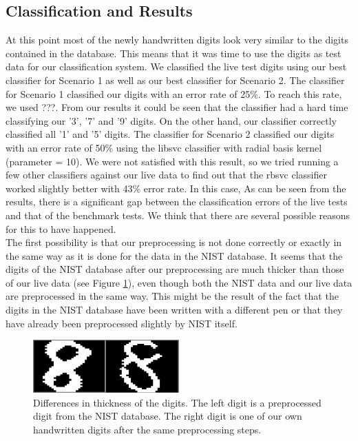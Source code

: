 \documentclass[11pt,twoside,a4paper]{article}
\begin{document}
\subsection{Classification and Results}
At this point most of the newly handwritten digits look very similar to the digits contained in the database. This means that it was time to use the digits as test data for our classification system. We classified the live test digits using our best classifier for Scenario 1 as well as our best classifier for Scenario 2. 
\newline
\newline
The classifier for Scenario 1 classified our digits with an error rate of 25\%. To reach this rate, we used ???. From our results it could be seen that the classifier had a hard time classifying our '3', '7' and '9' digits. On the other hand, our classifier correctly classified all '1' and '5' digits.\newline
\newline
The classifier for Scenario 2 classified our digits with an error rate of 50\% using the libsvc classifier with radial basis kernel (parameter = 10). We were not satisfied with this result, so we tried running a few other classifiers against our live data to find out that the rbsvc classifier worked slightly better with 43\% error rate. In this case,  \newline
\newline
As can be seen from the results, there is a significant gap between the classification errors of the live tests and that of the benchmark tests. We think that there are several possible reasons for this to have happened.\\
The first possibility is that our preprocessing is not done correctly or exactly in the same way as it is done for the data in the NIST database. It seems that the digits of the NIST database after our preprocessing are much thicker than those of our live data (see Figure \ref{img:thickness}), even though both the NIST data and our live data are preprocessed in the same way. This might be the result of the fact that the digits in the NIST database have been written with a different pen or that they have already been preprocessed slightly by NIST itself.\newline
\begin{figure}[h]
  \centering
  \captionsetup{justification=centering}
  \includegraphics[width=0.5\textwidth]{NISTvsLIVEthickness.png}
  \caption{Differences in thickness of the digits. The left digit is a preprocessed digit from the NIST database. The right digit is one of our own handwritten digits after the same preprocessing steps.}
  \label{img:thickness}
\end{figure}
\end{document}

